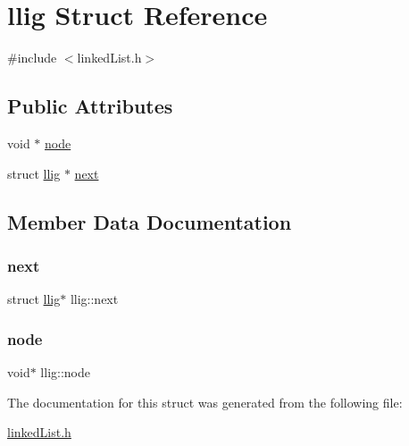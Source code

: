 \hypertarget{structllig}{}\section{llig Struct Reference}
\label{structllig}


{\ttfamily \#include $<$linked\+List.\+h$>$}

\subsection*{Public Attributes}
\begin{DoxyCompactItemize}
\item 
void $\ast$ \hyperlink{structllig_a83813de734fd2797d4ab3b3619b2d6fd}{node}
\item 
struct \hyperlink{structllig}{llig} $\ast$ \hyperlink{structllig_a187213d41e54fb8b23e482e7321c4763}{next}
\end{DoxyCompactItemize}


\subsection{Member Data Documentation}
\mbox{\label{structllig_a187213d41e54fb8b23e482e7321c4763}} 
\subsubsection{\texorpdfstring{next}{next}}
{\footnotesize\ttfamily struct \hyperlink{structllig}{llig}$\ast$ llig\+::next}

\mbox{\label{structllig_a83813de734fd2797d4ab3b3619b2d6fd}} 
\subsubsection{\texorpdfstring{node}{node}}
{\footnotesize\ttfamily void$\ast$ llig\+::node}



The documentation for this struct was generated from the following file\+:\begin{DoxyCompactItemize}
\item 
\hyperlink{linkedList_8h}{linked\+List.\+h}\end{DoxyCompactItemize}
